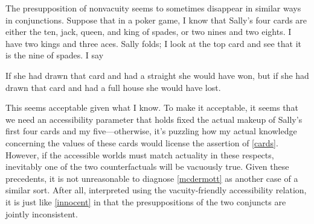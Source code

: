 \documentclass[If.tex]{subfiles}
\begin{document}


The presupposition of nonvacuity seems to sometimes disappear in similar ways in conjunctions. Suppose that in a poker game, I know that Sally's four cards are either the ten, jack, queen, and king of spades, or two nines and two eights. I have two kings and three aces. Sally folds; I look at the top card and see that it is the nine of spades. I say
\begin{prop}
	\nitem \label{cards}
	If she had drawn that card and had a straight she would have won, but if she had drawn that card and had a full house she would have lost.
\end{prop}
This seems acceptable given what I know. To make it acceptable, it seems that we need an accessibility parameter that holds fixed the actual makeup of Sally's first four cards and my five---otherwise, it's puzzling how my actual knowledge concerning the values of these cards would license the assertion of \ref{cards}.  However, if the accessible worlds must match actuality in these respects, inevitably one of the two counterfactuals will be vacuously true.  Given these precedents, it is not unreasonable to diagnose \ref{mcdermott} as another case of a similar sort.  After all, interpreted using the vacuity-friendly accessibility relation, it is just like \ref{innocent} in that the presuppositions of the two conjuncts are jointly inconsistent.  

\end{document}

